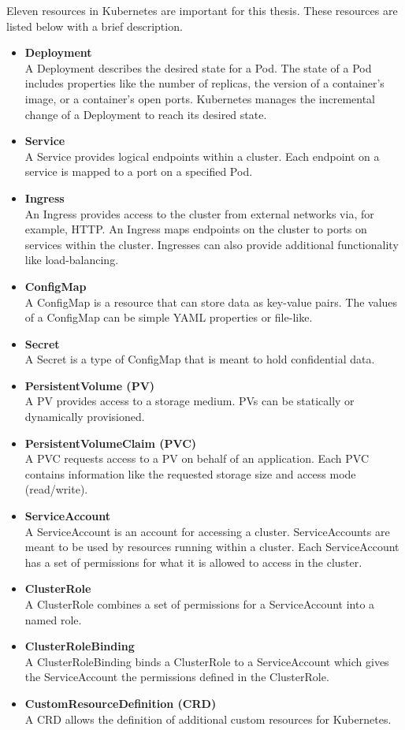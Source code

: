 Eleven resources in Kubernetes are important for this thesis.
These resources are listed below with a brief description.
\begin{itemize}
	\item \textbf{Deployment} \\
	A Deployment describes the desired state for a Pod.
	The state of a Pod includes properties like the number of replicas,
	the version of a container's image, or a container's open ports.
	Kubernetes manages the incremental change of a Deployment to reach its desired state.
	\item \textbf{Service} \\
	A Service provides logical endpoints within a cluster.
	Each endpoint on a service is mapped to a port on a specified Pod.
	\item \textbf{Ingress} \\
	An Ingress provides access to the cluster from external networks via, for example, HTTP.
	An Ingress maps endpoints on the cluster to ports on services within the cluster.
	Ingresses can also provide additional functionality like load-balancing.
	\item \textbf{ConfigMap} \\
	A ConfigMap is a resource that can store data as key-value pairs.
	The values of a ConfigMap can be simple YAML properties or file-like.
	\item \textbf{Secret} \\
	A Secret is a type of ConfigMap that is meant to hold confidential data.
	\item \textbf{PersistentVolume (PV)} \\
	A PV provides access to a storage medium. PVs can be statically or dynamically
	provisioned.
	\item \textbf{PersistentVolumeClaim (PVC)} \\
	A PVC requests access to a PV on behalf of an application.
	Each PVC contains information like the requested storage size and access mode (read/write).
	\item \textbf{ServiceAccount} \\
	A ServiceAccount is an account for accessing a cluster. ServiceAccounts are meant
	to be used by resources running within a cluster. Each ServiceAccount has a set of
	permissions for what it is allowed to access in the cluster.
	\item \textbf{ClusterRole} \\
	A ClusterRole combines a set of permissions for a ServiceAccount into a named role.
	\item \textbf{ClusterRoleBinding} \\
	A ClusterRoleBinding binds a ClusterRole to a ServiceAccount which gives
	the ServiceAccount the permissions defined in the ClusterRole.
	\item \textbf{CustomResourceDefinition (CRD)} \\
	A CRD allows the definition of additional custom resources for Kubernetes.
\end{itemize}

